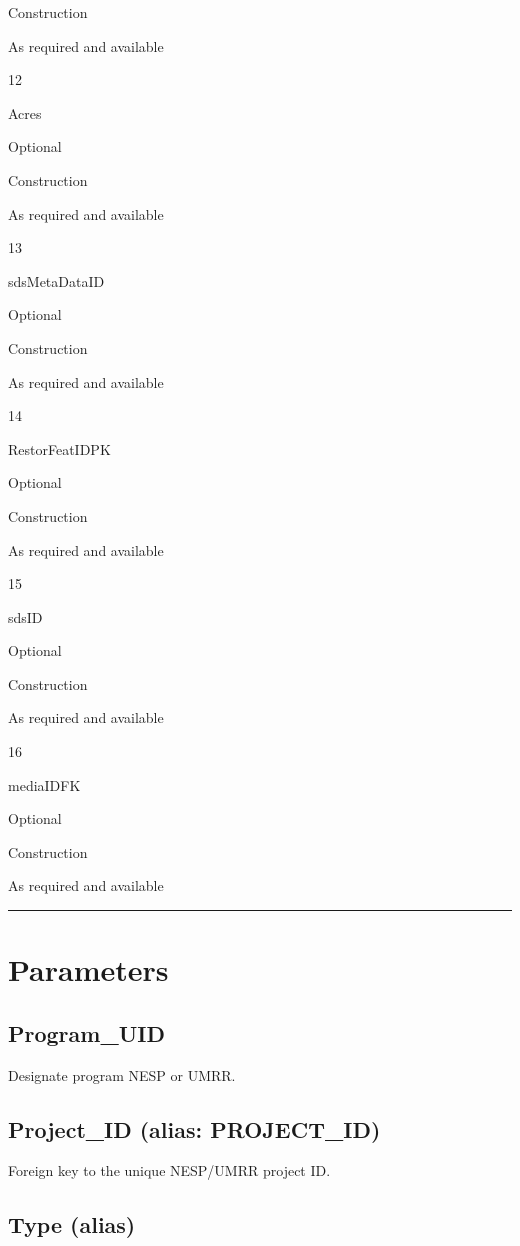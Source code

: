 \documentclass[
  letterpaper,
  DIV=11,
  numbers=noendperiod]{scrreprt}
\begin{document}
Construction

As required and available

12

Acres

Optional

Construction

As required and available

13

sdsMetaDataID

Optional

Construction

As required and available

14

RestorFeatIDPK

Optional

Construction

As required and available

15

sdsID

Optional

Construction

As required and available

16

mediaIDFK

Optional

Construction

As required and available

\begin{center}\rule{0.5\linewidth}{0.5pt}\end{center}

\section{Parameters}\label{parameters-16}

\subsection{Program\_UID}\label{program_uid-16}

Designate program NESP or UMRR.

\subsection{Project\_ID (alias:
PROJECT\_ID)}\label{project_id-alias-project_id-16}

Foreign key to the unique NESP/UMRR project ID.

\subsection{Type (alias)}\label{type-alias-15}
\end{document}
